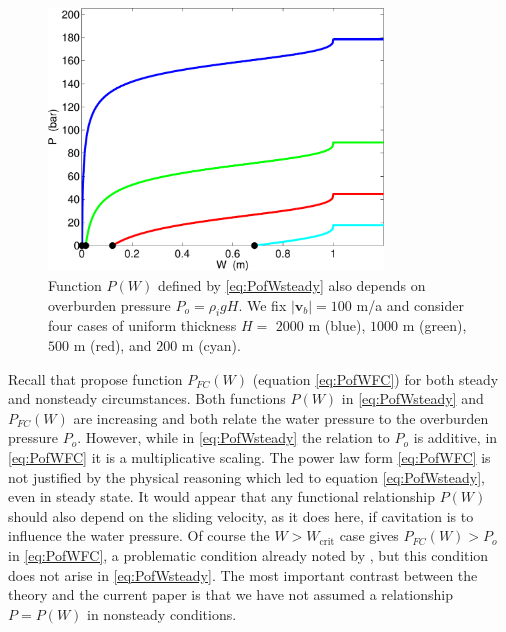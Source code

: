 \documentclass[11pt,final]{amsart}
\newcommand\bv{\mathbf{v}}
\begin{document}
\begin{figure}[ht]
\includegraphics[width=3.5in,keepaspectratio=true]{psteady-Po}
\medskip
\caption{Function $P(W)$ defined by \eqref{eq:PofWsteady} also depends on overburden pressure $P_o=\rho_i g H$.  We fix $|\bv_b|=100$ m/a and consider four cases of uniform thickness $H=$ $2000$ m (blue), $1000$ m (green), $500$ m (red), and $200$ m (cyan).}
\label{fig:psteady-Po}
\end{figure}

Recall that \cite{FlowersClarke2002_theory} propose function $P_{FC}(W)$ (equation \eqref{eq:PofWFC}) for both steady and nonsteady circumstances.  Both functions $P(W)$ in \eqref{eq:PofWsteady} and $P_{FC}(W)$ are increasing and both relate the water pressure to the overburden pressure $P_o$.  However, while in \eqref{eq:PofWsteady} the relation to $P_o$ is additive, in \eqref{eq:PofWFC} it is a multiplicative scaling.  The power law form \eqref{eq:PofWFC} is not justified by the physical reasoning which led to equation \eqref{eq:PofWsteady}, even in steady state.   It would appear that any functional relationship $P(W)$ should also depend on the sliding velocity, as it does here, if cavitation is to influence the water pressure.  Of course the $W>W_{\text{crit}}$ case gives $P_{FC}(W) > P_o$ in \eqref{eq:PofWFC}, a problematic condition already noted by \cite{Schoofetal2012}, but this condition does not arise in \eqref{eq:PofWsteady}.  The most important contrast between the \cite{FlowersClarke2002_theory} theory and the current paper is that we have not assumed a relationship $P=P(W)$ in nonsteady conditions.
\end{document}
